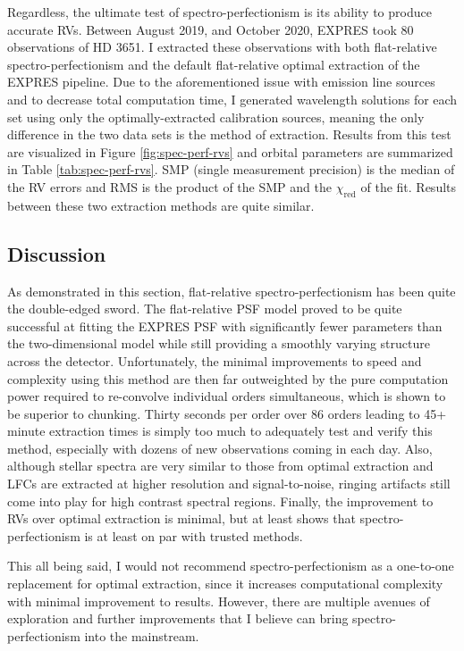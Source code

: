 Regardless, the ultimate test of spectro-perfectionism is its ability to produce accurate RVs. Between August 2019, and October 2020, EXPRES took 80 observations of HD 3651. I extracted these observations with both flat-relative spectro-perfectionism and the default flat-relative optimal extraction of the EXPRES pipeline. Due to the aforementioned issue with emission line sources and to decrease total computation time, I generated wavelength solutions for each set using only the optimally-extracted calibration sources, meaning the only difference in the two data sets is the method of extraction. Results from this test are visualized in Figure \ref{fig:spec-perf-rvs} and orbital parameters are summarized in Table \ref{tab:spec-perf-rvs}. SMP (single measurement precision) is the median of the RV errors and RMS is the product of the SMP and the $\chi_\mathrm{red}$ of the fit. Results between these two extraction methods are quite similar.

\subsection{Discussion}

As demonstrated in this section, flat-relative spectro-perfectionism has been quite the double-edged sword. The flat-relative PSF model proved to be quite successful at fitting the EXPRES PSF with significantly fewer parameters than the two-dimensional model while still providing a smoothly varying structure across the detector. Unfortunately, the minimal improvements to speed and complexity using this method are then far outweighted by the pure computation power required to re-convolve individual orders simultaneous, which is shown to be superior to chunking. Thirty seconds per order over 86 orders leading to 45+ minute extraction times is simply too much to adequately test and verify this method, especially with dozens of new observations coming in each day. Also, although stellar spectra are very similar to those from optimal extraction and LFCs are extracted at higher resolution and signal-to-noise, ringing artifacts still come into play for high contrast spectral regions. Finally, the improvement to RVs over optimal extraction is minimal, but at least shows that spectro-perfectionism is at least on par with trusted methods.

This all being said, I would not recommend spectro-perfectionism as a one-to-one replacement for optimal extraction, since it increases computational complexity with minimal improvement to results. However, there are multiple avenues of exploration and further improvements that I believe can bring spectro-perfectionism into the mainstream.

